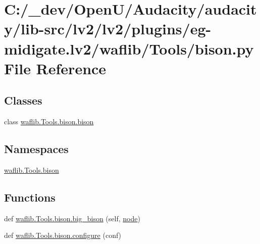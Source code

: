 \hypertarget{lv2_2plugins_2eg-midigate_8lv2_2waflib_2_tools_2bison_8py}{}\section{C\+:/\+\_\+dev/\+Open\+U/\+Audacity/audacity/lib-\/src/lv2/lv2/plugins/eg-\/midigate.lv2/waflib/\+Tools/bison.py File Reference}
\label{lv2_2plugins_2eg-midigate_8lv2_2waflib_2_tools_2bison_8py}
\subsection*{Classes}
\begin{DoxyCompactItemize}
\item 
class \hyperlink{classwaflib_1_1_tools_1_1bison_1_1bison}{waflib.\+Tools.\+bison.\+bison}
\end{DoxyCompactItemize}
\subsection*{Namespaces}
\begin{DoxyCompactItemize}
\item 
 \hyperlink{namespacewaflib_1_1_tools_1_1bison}{waflib.\+Tools.\+bison}
\end{DoxyCompactItemize}
\subsection*{Functions}
\begin{DoxyCompactItemize}
\item 
def \hyperlink{namespacewaflib_1_1_tools_1_1bison_ab34716254c6b552f235c340bad47b596}{waflib.\+Tools.\+bison.\+big\+\_\+bison} (self, \hyperlink{structnode}{node})
\item 
def \hyperlink{namespacewaflib_1_1_tools_1_1bison_af8585015f181d6117510d086dd42623a}{waflib.\+Tools.\+bison.\+configure} (conf)
\end{DoxyCompactItemize}
